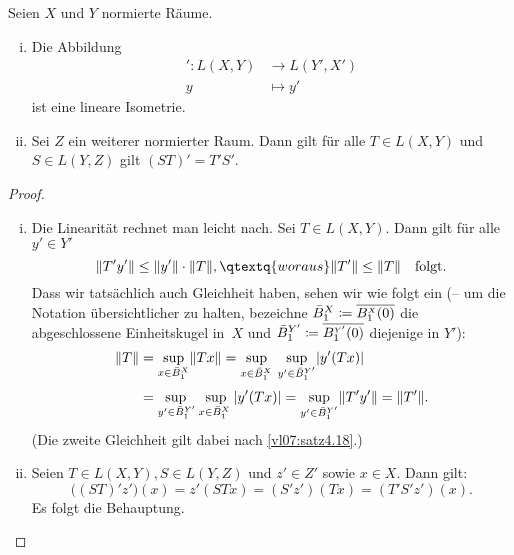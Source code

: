 \begin{thSatz}
    Seien $X$ und $Y$ normierte Räume. 
    \begin{enumerate}[(i)]
        \item
            Die Abbildung
            \begin{align*}
                {}'\colon L(X,Y) &\to L(Y',X')  \\
                y &\mapsto y'
            \end{align*}
            ist eine lineare Isometrie.
            
        \item 
            Sei $Z$ ein weiterer normierter Raum.
            Dann gilt für alle $T\in L(X,Y)$ und $S\in L(Y,Z)$ 
            gilt $(ST)' = T'S'$.
    \end{enumerate}
\end{thSatz}

\begin{proof}\hfill
    \begin{enumerate}[(i)]
        \item
            Die Linearität rechnet man leicht nach. Sei $T\in L(X,Y)$. Dann gilt
            für alle $y'\in Y'$
            \[ \norm{T'y'} \leq \norm{y'} \cdot \norm{T}, \qtextq{woraus} 
                \norm{T'} \leq \norm{T} \quad\text{folgt}
            . \]
            Dass wir tatsächlich auch Gleichheit haben, sehen wir wie folgt ein
            (-- um die Notation übersichtlicher zu halten, bezeichne $\bar B^X_1
            \coloneqq \overline{B^{\scriptscriptstyle X}_1(0)}$ die
            abgeschlossene Einheitskugel in~$X$ und $\bar B^{Y'}_1 \coloneqq
            \overline{B^{\scriptscriptstyle Y'}_1(0)}$ diejenige in $Y'$):
            \begin{align*}
                \norm{T} 
                &= \sup_{x\in \bar B^X_1} \norm{Tx}
                 = \adjustlimits
                   \sup_{x\in \bar B^X_1\;} 
                    \sup_{y'\in \bar B^{Y'}_1} \abs{y'(Tx)}
                \\[2pt]
                &= \adjustlimits
                   \sup_{y'\in \bar B^{Y'}_1} 
                    \sup_{x\in \bar B^X_1\;} \abs{y'(Tx)}
                 = \sup_{y'\in \bar B^{Y'}_1} \norm{T'y'}
                 = \norm{T'}
            . \end{align*}
            (Die zweite Gleichheit gilt dabei nach \cref{vl07:satz4.18}.)
        
        \item
            Seien $T\in L(X,Y), S\in L(Y,Z)$ und $z'\in Z'$ sowie $x\in X$. Dann
            gilt:
            \[ \bigl( (ST)' z' \bigr)(x) = z'(STx) 
                = (S'z')(Tx) = (T'S'z')(x)  
            . \]
            Es folgt die Behauptung.
    \end{enumerate}
\end{proof}
        
